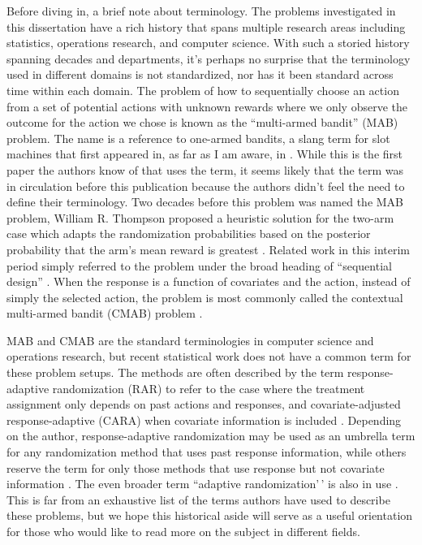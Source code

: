 \documentclass[12pt,,letterpaper,twoside]{report}
\begin{document}
Before diving in, a brief note about terminology. The problems
investigated in this dissertation have a rich history that spans
multiple research areas including statistics, operations research, and
computer science. With such a storied history spanning decades and
departments, it's perhaps no surprise that the terminology used in
different domains is not standardized, nor has it been standard across
time within each domain. The problem of how to sequentially choose an
action from a set of potential actions with unknown rewards where we
only observe the outcome for the action we chose is known as the
``multi-armed bandit'' (MAB) problem. The name is a reference to
one-armed bandits, a slang term for slot machines that first appeared
in, as far as I am aware, in \cite{bush1953stochastic}. While this is
the first paper the authors know of that uses the term, it seems likely
that the term was in circulation before this publication because the
authors didn't feel the need to define their terminology. Two decades
before this problem was named the MAB problem, William R. Thompson
proposed a heuristic solution for the two-arm case which adapts the
randomization probabilities based on the posterior probability that the
arm's mean reward is greatest \cite{thompson1933likelihood}. Related
work in this interim period simply referred to the problem under the
broad heading of ``sequential design''
\citep{wald1947sequential, robbins1952some}. When the response is a
function of covariates and the action, instead of simply the selected
action, the problem is most commonly called the contextual multi-armed
bandit (CMAB) problem \citep{woodroofe1979one, langford2007epoch}.

MAB and CMAB are the standard terminologies in computer science and
operations research, but recent statistical work does not have a common
term for these problem setups. The methods are often described by the
term response-adaptive randomization (RAR) to refer to the case where
the treatment assignment only depends on past actions and responses, and
covariate-adjusted response-adaptive (CARA) when covariate information
is included \citep{hu2006theory}. Depending on the author,
response-adaptive randomization may be used as an umbrella term for any
randomization method that uses past response information, while others
reserve the term for only those methods that use response but not
covariate information \citep{hu2006theory}. The even broader term
``adaptive randomization'\,' is also in use \cite{thall2015statistical}.
This is far from an exhaustive list of the terms authors have used to
describe these problems, but we hope this historical aside will serve as
a useful orientation for those who would like to read more on the
subject in different fields.
\end{document}
